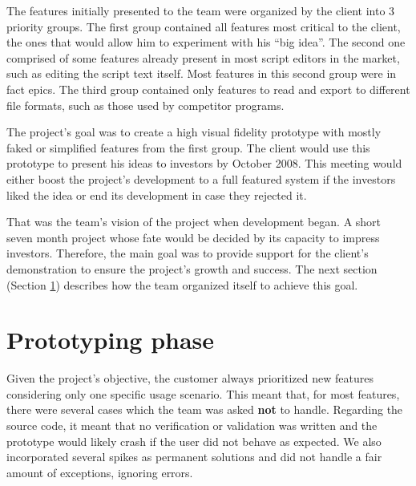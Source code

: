 \documentclass[lnbip]{svmultln}
\begin{document}

The features initially presented to the team were organized by the
client into 3 priority groups. The first group contained all features
most critical to the client, the ones that would allow him to
experiment with his ``big idea''. The second one comprised of some
features already present in most script editors in the market, such as
editing the script text itself. Most features in this second group
were in fact epics. The third group contained only features to read
and export to different file formats, such as those used by competitor
programs.

The project's goal was to create a high visual fidelity prototype with
mostly faked or simplified features from the first group. The client
would use this prototype to present his ideas to investors by October
2008. This meeting would either boost the project's development to a
full featured system if the investors liked the idea or end its
development in case they rejected it.

That was the team's vision of the project when development began. A
short seven month project whose fate would be decided by its capacity
to impress investors. Therefore, the main goal was to provide support
for the client's demonstration to ensure the project's growth and
success. The next section (Section \ref{sec:working}) describes how
the team organized itself to achieve this goal.

\section{Prototyping phase}
\label{sec:working}

Given the project's objective, the customer always prioritized new
features considering only one specific usage scenario. This meant
that, for most features, there were several cases which the team was
asked \textbf{not} to handle. Regarding the source code, it meant that
no verification or validation was written and the prototype would
likely crash if the user did not behave as expected. We also
incorporated several spikes as permanent solutions and did not handle
a fair amount of exceptions, ignoring errors.
\end{document}
